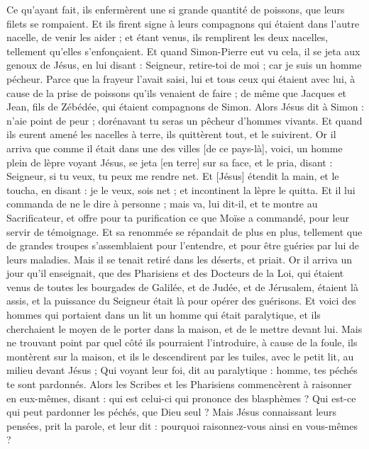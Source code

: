 \begin{multicols}{2}
Ce qu'ayant fait, ils enfermèrent une si grande quantité de poissons, que leurs filets se rompaient.
Et ils firent signe à leurs compagnons qui étaient dans l'autre nacelle, de venir les aider ; et étant venus, ils remplirent les deux nacelles, tellement qu'elles s'enfonçaient.
Et quand Simon-Pierre eut vu cela, il se jeta aux genoux de Jésus, en lui disant : Seigneur, retire-toi de moi ; car je suis un homme pécheur.
Parce que la frayeur l'avait saisi, lui et tous ceux qui étaient avec lui, à cause de la prise de poissons qu'ils venaient de faire ; de même que Jacques et Jean, fils de Zébédée, qui étaient compagnons de Simon.
Alors Jésus dit à Simon : n'aie point de peur ; dorénavant tu seras un pêcheur d'hommes vivants.
Et quand ils eurent amené les nacelles à terre, ils quittèrent tout, et le suivirent.
Or il arriva que comme il était dans une des villes [de ce pays-là], voici, un homme plein de lèpre voyant Jésus, se jeta [en terre] sur sa face, et le pria, disant : Seigneur, si tu veux, tu peux me rendre net.
Et [Jésus] étendit la main, et le toucha, en disant : je le veux, sois net ; et incontinent la lèpre le quitta.
Et il lui commanda de ne le dire à personne ; mais va, lui dit-il, et te montre au Sacrificateur, et offre pour ta purification ce que Moïse a commandé, pour leur servir de témoignage.
Et sa renommée se répandait de plus en plus, tellement que de grandes troupes s'assemblaient pour l'entendre, et pour être guéries par lui de leurs maladies.
Mais il se tenait retiré dans les déserts, et priait.
Or il arriva un jour qu'il enseignait, que des Pharisiens et des Docteurs de la Loi, qui étaient venus de toutes les bourgades de Galilée, et de Judée, et de Jérusalem, étaient là assis, et la puissance du Seigneur était là pour opérer des guérisons.
Et voici des hommes qui portaient dans un lit un homme qui était paralytique, et ils cherchaient le moyen de le porter dans la maison, et de le mettre devant lui.
Mais ne trouvant point par quel côté ils pourraient l'introduire, à cause de la foule, ils montèrent sur la maison, et ils le descendirent par les tuiles, avec le petit lit, au milieu devant Jésus ;
Qui voyant leur foi, dit au paralytique : homme, tes péchés te sont pardonnés.
Alors les Scribes et les Pharisiens commencèrent à raisonner en eux-mêmes, disant : qui est celui-ci qui prononce des blasphèmes ? Qui est-ce qui peut pardonner les péchés, que Dieu seul ?
Mais Jésus connaissant leurs pensées, prit la parole, et leur dit : pourquoi raisonnez-vous ainsi en vous-mêmes ?

\end{multicols}
